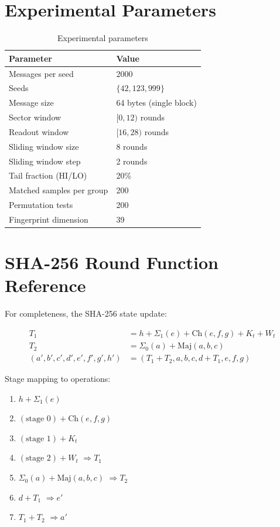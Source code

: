 \documentclass[11pt,a4paper]{article}
\theoremstyle{plain}
\theoremstyle{definition}
\theoremstyle{remark}
\newcommand{\Maj}{\mathrm{Maj}}
\newcommand{\Ch}{\mathrm{Ch}}
\begin{document}
\section{Experimental Parameters}

\begin{table}[h]
\centering
\begin{tabular}{ll}
\toprule
Parameter & Value \\
\midrule
Messages per seed & 2000 \\
Seeds & $\{42, 123, 999\}$ \\
Message size & 64 bytes (single block) \\
Sector window & $[0, 12)$ rounds \\
Readout window & $[16, 28)$ rounds \\
Sliding window size & 8 rounds \\
Sliding window step & 2 rounds \\
Tail fraction (HI/LO) & 20\% \\
Matched samples per group & 200 \\
Permutation tests & 200 \\
Fingerprint dimension & 39 \\
\bottomrule
\end{tabular}
\caption{Experimental parameters}
\end{table}

\section{SHA-256 Round Function Reference}

For completeness, the SHA-256 state update:

\begin{align}
T_1 &= h + \Sigma_1(e) + \Ch(e,f,g) + K_t + W_t \\
T_2 &= \Sigma_0(a) + \Maj(a,b,c) \\
(a', b', c', d', e', f', g', h') &= (T_1 + T_2, a, b, c, d + T_1, e, f, g)
\end{align}

Stage mapping to operations:
\begin{enumerate}[start=0]
    \item $h + \Sigma_1(e)$
    \item $(\text{stage 0}) + \Ch(e,f,g)$
    \item $(\text{stage 1}) + K_t$
    \item $(\text{stage 2}) + W_t$ \quad $\Rightarrow T_1$
    \item $\Sigma_0(a) + \Maj(a,b,c)$ \quad $\Rightarrow T_2$
    \item $d + T_1$ \quad $\Rightarrow e'$
    \item $T_1 + T_2$ \quad $\Rightarrow a'$
\end{enumerate}
\end{document}
